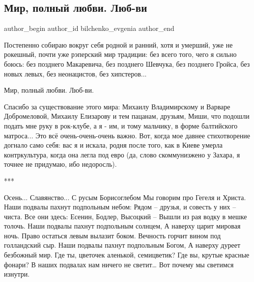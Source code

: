  
 
 
 
 
 
\subsection{Мир, полный любви. Люб-ви}
\label{sec:21_11_2021.fb.bilchenko_evgenia.1.mir_polnyj_ljubvi}
 
\ifcmt
 author_begin
   author_id bilchenko_evgenia
 author_end
\fi

Постепенно собираю вокруг себя родной и ранний, хотя и умерший, уже не
рокешный, почти уже рэперский мир традиции: без всего того, чего я сильно
боюсь: без позднего Макаревича, без позднего Шевчука, без позднего Гройса, без
новых левых, без неонацистов, без хипстеров... 


Мир, полный любви. Люб-ви. 

Спасибо за существование этого мира: Михаилу Владимирскому и Варваре
Добромеловой, Михаилу Елизарову и тем пацанам, друзьям, Миши, что подошли
подать мне руку в рок-клубе, а я - им, и тому мальчику, в форме балтийского
матроса... Это всё очень-очень-очень важно. Вот, когда мое давнее стихотворение
догнало само себя: вас я и искала, родня после того, как в Киеве умерла
контркультура, когда она легла под евро (да, слово скоммунизжено у Захара, я
точнее не придумаю, ибо недоросль). 


***

\begin{multicols}{2}
\obeycr
Осень... Славянство... С русым Борисоглебом
Мы говорим про Гегеля и Христа.
Наши подвалы пахнут подпольным небом:
Рядом – друзья, и совесть у них – чиста.
\smallskip
Все они здесь: Есенин, Бодлер, Высоцкий –
Вышли из рая водку в мешке толочь.
Наши подвалы пахнут подпольным солнцем,
А наверху царит мировая ночь.
\smallskip
Право остаться левым вылазит боком.
Вечность горчит вином под голландский сыр.
Наши подвалы пахнут подпольным Богом,
А наверху дуреет безбожный мир.
\smallskip
Где ты, цветочек аленькой, семицветик?
Где вы, крутые красные фонари?
В наших подвалах нам ничего не светит…
Вот почему мы светимся изнутри.
\restorecr
\end{multicols}

